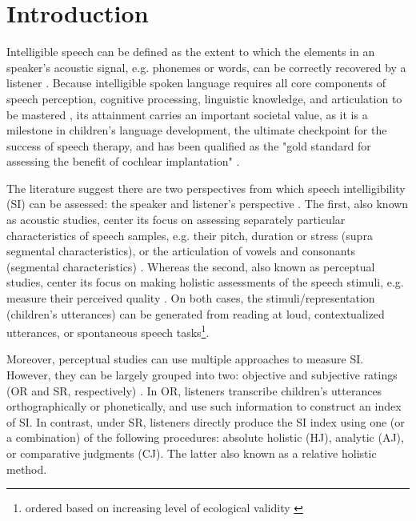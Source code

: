 \section{Introduction}

Intelligible speech can be defined as the extent to which the elements in an speaker's acoustic signal, e.g. phonemes or words, can be correctly recovered by a listener \citep{Kent_et_al_1989, Whitehill_et_al_2004, vanHeuven_2008, Freeman_et_al_2017}. Because intelligible spoken language requires all core components of speech perception, cognitive processing, linguistic knowledge, and articulation to be mastered \citep{Freeman_et_al_2017}, its attainment carries an important societal value, as it is a milestone in children's language development, the ultimate checkpoint for the success of speech therapy, and has been qualified as the "gold standard for assessing the benefit of cochlear implantation" \citep{Chin_et_al_2012}. 

The literature suggest there are two perspectives from which speech intelligibility (SI) can be assessed: the speaker and listener's perspective \citep{Boonen_et_al_2020, Boonen_et_al_2021}. The first, also known as acoustic studies, center its focus on assessing separately particular characteristics of speech samples, e.g. their pitch, duration or stress (supra segmental characteristics), or the articulation of vowels and consonants (segmental characteristics) \citep{Rowe_et_al_2018}. Whereas the second, also known as perceptual studies, center its focus on making holistic assessments of the speech stimuli, e.g. measure their perceived quality \citep{Boonen_et_al_2020, Boonen_et_al_2021}. On both cases, the stimuli/representation (children's utterances) can be generated from reading at loud, contextualized utterances, or spontaneous speech tasks\footnote{ordered based on increasing level of ecological validity \citep{Flipsen_2006,Ertmer_2011}}.

\begin{comment}
Based on their description, it seems that that perceptual studies are more subjective than acoustic studies, as they do not rely on "objective" measurements, i.e. time duration, wave amplitude, among others, available in the former. However, for the case of SI, there are objective and subjective assessment methodologies.
\end{comment}

Moreover, perceptual studies can use multiple approaches to measure SI. However, they can be largely grouped into two: objective and subjective ratings (OR and SR, respectively) \citep{Hustad_et_al_2020}. In OR, listeners transcribe children's utterances orthographically or phonetically, and use such information to construct an index of SI. In contrast, under SR, listeners directly produce the SI index using one (or a combination) of the following procedures: absolute holistic (HJ), analytic (AJ), or comparative judgments (CJ). The latter also known as a relative holistic method. 

